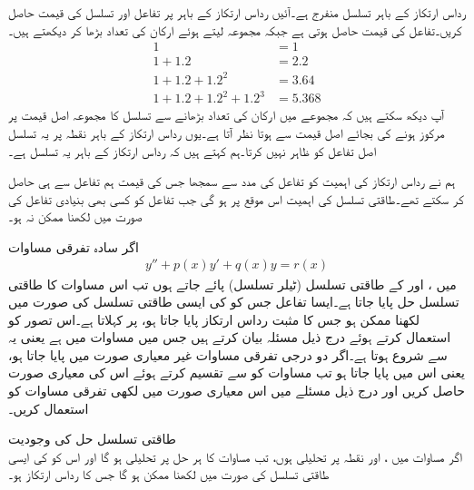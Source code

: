 رداس ارتکاز کے باہر تسلسل منفرج ہے۔آئیں رداس ارتکاز کے باہر  پر تفاعل اور تسلسل کی قیمت حاصل کریں۔تفاعل کی قیمت  حاصل ہوتی ہے جبکہ مجموعہ لیتے ہوئے ارکان کی تعداد بڑھا کر دیکھتے ہیں۔ 
\begin{align*}
1&=1 \\
1+1.2&=2.2\\
1+1.2+1.2^2&=3.64\\
1+1.2+1.2^2+1.2^3&=5.368
\end{align*}
آپ دیکھ سکتے ہیں کہ مجموعے میں ارکان کی تعداد بڑھانے سے تسلسل کا مجموعہ اصل قیمت پر مرکوز ہونے کی بجائے اصل قیمت سے  ہوتا نظر آتا ہے۔یوں رداس ارتکاز کے باہر نقطہ  پر یہ تسلسل اصل تفاعل کو ظاہر نہیں کرتا۔ہم کہتے ہیں کہ رداس ارتکاز کے باہر یہ تسلسل  ہے۔

ہم نے رداس ارتکاز کی اہمیت کو تفاعل  کی مدد سے سمجھا جس کی قیمت ہم تفاعل سے ہی حاصل کر سکتے تھے۔طاقتی تسلسل کی اہمیت اس موقع پر ہو گی جب تفاعل کو کسی بھی بنیادی تفاعل کی صورت میں لکھنا ممکن نہ ہو۔


اگر سادہ تفرقی مساوات
\begin{align}\label{مساوات_بیسل_معیاری_تفرقی_مساوات_الف}
y''+p(x)y'+q(x)y=r(x)
\end{align}
میں ،  اور  کے طاقتی تسلسل (ٹیلر تسلسل) پائے جاتے ہوں تب اس مساوات کا طاقتی تسلسل حل پایا جاتا ہے۔ایسا تفاعل  جس کو  کی ایسی طاقتی تسلسل کی صورت میں لکھنا ممکن ہو جس کا مثبت رداس ارتکاز پایا جاتا ہو،  پر  کہلاتا ہے۔اس تصور کو استعمال کرتے ہوئے درج ذیل مسئلہ بیان کرتے ہیں جس میں مساوات   میں ہے یعنی یہ  سے شروع ہوتا ہے۔اگر دو درجی تفرقی مساوات غیر معیاری صورت میں پایا جاتا ہو، یعنی اس میں  پایا جاتا ہو تب مساوات کو  سے تقسیم کرتے ہوئے اس کی معیاری صورت حاصل کریں اور درج ذیل مسئلے میں اس معیاری صورت میں لکھی تفرقی مساوات کو استعمال کریں۔

\quad طاقتی تسلسل حل کی وجودیت\\
اگر مساوات  میں ،  اور  نقطہ  پر تحلیلی ہوں، تب مساوات  کا ہر حل  پر تحلیلی ہو گا اور اس کو  کی ایسی طاقتی تسلسل کی صورت میں لکھنا ممکن ہو گا جس کا رداس ارتکاز  ہو۔

